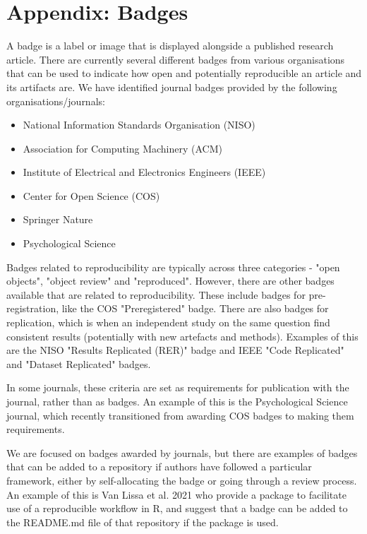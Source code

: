 \section{Appendix: Badges} \label{appendix:badges}

A badge is a label or image that is displayed alongside a published research article. There are currently several different badges from various organisations that can be used to indicate how open and potentially reproducible an article and its artifacts are. We have identified journal badges provided by the following organisations/journals:
\begin{itemize}
    \item National Information Standards Organisation (NISO)
    \item Association for Computing Machinery (ACM)
    \item Institute of Electrical and Electronics Engineers (IEEE)
    \item Center for Open Science (COS)
    \item Springer Nature
    \item Psychological Science
\end{itemize}

Badges related to reproducibility are typically across three categories - "open objects", "object review" and "reproduced". However, there are other badges available that are related to reproducibility. These include badges for pre-registration, like the COS "Preregistered" badge.\autocite{blohowiak_badges_2023} There are also badges for replication, which is when an independent study on the same question find consistent results (potentially with new artefacts and methods). Examples of this are the NISO "Results Replicated (RER)" badge\autocite{niso_reproducibility_badging_and_definitions_working_group_reproducibility_2021} and IEEE "Code Replicated" and "Dataset Replicated" badges.\autocite{institute_of_electrical_and_electronics_engineers_ieee_about_nodate}

In some journals, these criteria are set as requirements for publication with the journal, rather than as badges. An example of this is the Psychological Science journal, which recently transitioned from awarding COS badges to making them requirements.\autocite{hardwicke_transparency_2023}

We are focused on badges awarded by journals, but there are examples of badges that can be added to a repository if authors have followed a particular framework, either by self-allocating the badge or going through a review process. An example of this is Van Lissa et al. 2021\autocite{van_lissa_worcs_2021} who provide a package to facilitate use of a reproducible workflow in R, and suggest that a badge can be added to the README.md file of that repository if the package is used.\autocite{van_lissa_worcs_2021}

